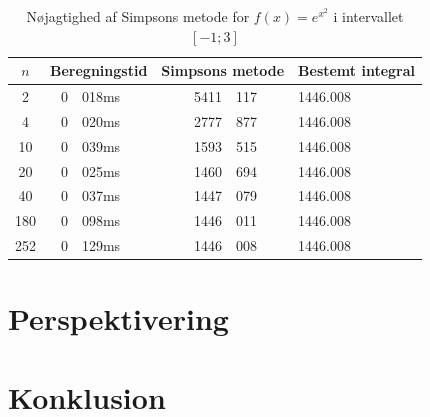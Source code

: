 \documentclass[12pt]{article}
\numberwithin{equation}{section}
\begin{document}
\begin{table}[H]
	\caption {Nøjagtighed af Simpsons metode for $f(x)=e^{x^2}$ i intervallet $[-1;3]$} 
	\begin{center}
		\begin{tabular}{|c|r@{.}l|r @{.} l|l|}
			\hline $n$ & \multicolumn{2}{|c|}{Beregningstid} & \multicolumn{2}{|c|}{Simpsons metode} & Bestemt integral
			\\ 
			\hline 2 & 0&018ms & 5411&117 & 1446.008\\ 
			\hline 4 & 0&020ms & 2777&877 & 1446.008\\ 
			\hline 10 & 0&039ms & 1593&515 & 1446.008\\ 
			\hline 20 & 0&025ms & 1460&694 & 1446.008\\ 
			\hline 40 & 0&037ms & 1447&079 & 1446.008\\ 
			\hline 180 & 0&098ms & 1446&011 & 1446.008\\
			\hline 252 & 0&129ms & 1446&008 & 1446.008\\
			\hline 
		\end{tabular}
	\end{center}
\end{table}

\section{Perspektivering}
\section{Konklusion}
\end{document}
